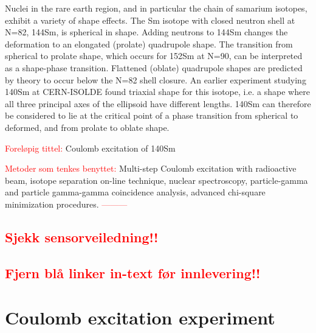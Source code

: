 \documentclass[twoside,english]{uiofysmaster/uiofysmaster}
\begin{document}
Nuclei in the rare earth region, and in particular the chain of samarium isotopes, exhibit a variety of shape effects. The Sm isotope with closed neutron shell at N=82, 144Sm, is spherical in shape. Adding neutrons to 144Sm changes the deformation to an elongated (prolate) quadrupole shape. The transition from spherical to prolate shape, which occurs for 152Sm at N=90, can be interpreted as a shape-phase transition. Flattened (oblate) quadrupole shapes are predicted by theory to occur below the N=82 shell closure. An earlier experiment studying 140Sm at CERN-ISOLDE found triaxial shape for this isotope, i.e. a shape where all three principal axes of the ellipsoid have different lengths. 140Sm can therefore be considered to lie at the critical point of a phase transition from spherical to deformed, and from prolate to oblate shape. \newline

\textcolor{red}{Foreløpig tittel:} \newline
Coulomb excitation of 140Sm \newline


\textcolor{red}{Metoder som tenkes benyttet:} \newline
Multi-step Coulomb excitation with radioactive beam, isotope separation on-line technique, nuclear spectroscopy, particle-gamma and particle gamma-gamma coincidence analysis, advanced chi-square minimization procedures. \newline
\textcolor{red}{---------} \newline


\section*{\textcolor{red}{Sjekk sensorveiledning!!}}


\section*{\textcolor{red}{Fjern blå linker in-text før innlevering!!}}

\newpage


\chapter{Coulomb excitation experiment} 
\end{document}
